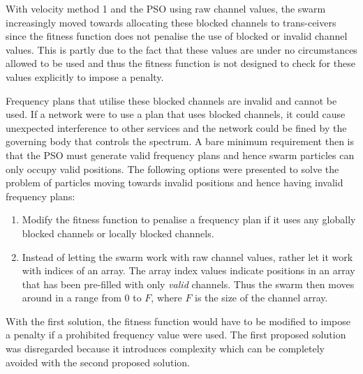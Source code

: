 With velocity method 1 and the PSO using raw channel values, the swarm increasingly moved towards allocating these blocked channels to trans-ceivers since the fitness function does not penalise the use of blocked or invalid channel values. This is partly due to the fact that these values are under no circumstances allowed to be used and thus the fitness function is not designed to check for these values explicitly to impose a penalty.

Frequency plans that utilise these blocked channels are invalid and cannot be used. If a network were to use a plan that uses blocked channels, it could cause unexpected interference to other services and the network could be fined by the governing body that controls the spectrum. A bare minimum requirement then is that the PSO must generate valid frequency plans and hence swarm particles can only occupy valid positions. The following options were presented to solve the problem of particles moving towards invalid positions and hence having invalid frequency plans:
\begin{enumerate}
\item Modify the fitness function to penalise a frequency plan if it uses any globally blocked channels or locally blocked channels.
\item Instead of letting the swarm work with raw channel values, rather let it work with indices of an array. The array index values indicate positions in an array that has been pre-filled with only \emph{valid} channels. Thus the swarm then moves around in a range from 0 to $F$, where $F$ is the size of the channel array.
\end{enumerate}

With the first solution, the fitness function would have to be modified to impose a penalty if a prohibited frequency value were used. The first proposed solution was disregarded because it introduces complexity which can be completely avoided with the second proposed solution.

